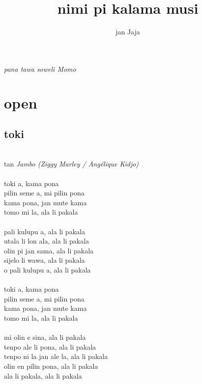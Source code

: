 \documentclass[a4paper]{amsbook}
\title{nimi pi kalama musi}
\author{jan Jaja}
\begin{document}
\frontmatter

\maketitle

\begin{titlepage}
\vspace*{\fill}
\begin{center}
\textit{pana tawa soweli Momo}
\end{center}
\vspace*{\fill}
\end{titlepage}

\tableofcontents

\mainmatter

\chapter{open}

\section{toki}

\begin{center}
~\\
tan {\itshape Jambo (Ziggy Marley / Angélique Kidjo)}\\
~\\
toki a, kama pona\\
pilin seme a, mi pilin pona\\
kama pona, jan mute kama\\
tomo mi la, ala li pakala\\
~\\
pali kulupu a, ala li pakala\\
utala li lon ala, ala li pakala\\
olin pi jan sama, ala li pakala\\
sijelo li wawa, ala li pakala\\
o pali kulupu a, ala li pakala\\
~\\
toki a, kama pona\\
pilin seme a, mi pilin pona\\
kama pona, jan mute kama\\
tomo mi la, ala li pakala\\
~\\
mi olin e sina, ala li pakala\\
tenpo ale li pona, ala li pakala\\
tenpo ni la jan ale la, ala li pakala\\
olin en pilin pona, ala li pakala\\
ala li pakala, ala li pakala\\
\end{center}
\end{document}
